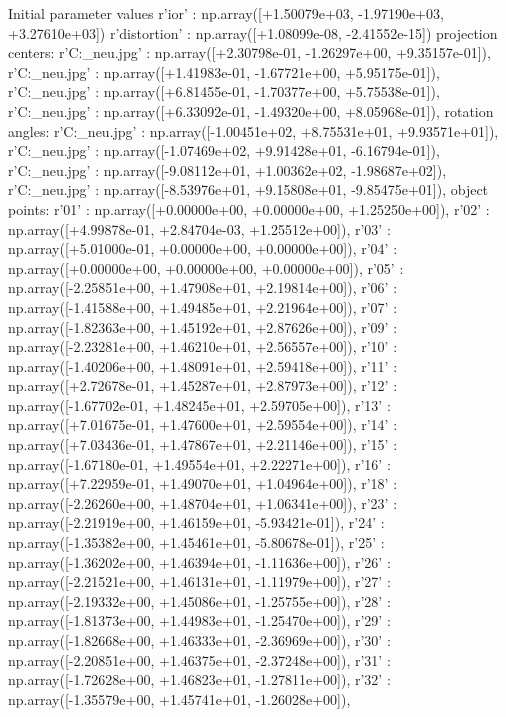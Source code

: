Initial parameter values
r'ior' : np.array([+1.50079e+03, -1.97190e+03, +3.27610e+03])
r'distortion' : np.array([+1.08099e-08, -2.41552e-15])
projection centers:
r'C:\Users\Clemens\Desktop\fotos_neu\1.jpg' : np.array([+2.30798e-01, -1.26297e+00, +9.35157e-01]),
r'C:\Users\Clemens\Desktop\fotos_neu\2.jpg' : np.array([+1.41983e-01, -1.67721e+00, +5.95175e-01]),
r'C:\Users\Clemens\Desktop\fotos_neu\3.jpg' : np.array([+6.81455e-01, -1.70377e+00, +5.75538e-01]),
r'C:\Users\Clemens\Desktop\fotos_neu\4.jpg' : np.array([+6.33092e-01, -1.49320e+00, +8.05968e-01]),
rotation angles:
r'C:\Users\Clemens\Desktop\fotos_neu\1.jpg' : np.array([-1.00451e+02, +8.75531e+01, +9.93571e+01]),
r'C:\Users\Clemens\Desktop\fotos_neu\2.jpg' : np.array([-1.07469e+02, +9.91428e+01, -6.16794e-01]),
r'C:\Users\Clemens\Desktop\fotos_neu\3.jpg' : np.array([-9.08112e+01, +1.00362e+02, -1.98687e+02]),
r'C:\Users\Clemens\Desktop\fotos_neu\4.jpg' : np.array([-8.53976e+01, +9.15808e+01, -9.85475e+01]),
object points:
r'01' : np.array([+0.00000e+00, +0.00000e+00, +1.25250e+00]),
r'02' : np.array([+4.99878e-01, +2.84704e-03, +1.25512e+00]),
r'03' : np.array([+5.01000e-01, +0.00000e+00, +0.00000e+00]),
r'04' : np.array([+0.00000e+00, +0.00000e+00, +0.00000e+00]),
r'05' : np.array([-2.25851e+00, +1.47908e+01, +2.19814e+00]),
r'06' : np.array([-1.41588e+00, +1.49485e+01, +2.21964e+00]),
r'07' : np.array([-1.82363e+00, +1.45192e+01, +2.87626e+00]),
r'09' : np.array([-2.23281e+00, +1.46210e+01, +2.56557e+00]),
r'10' : np.array([-1.40206e+00, +1.48091e+01, +2.59418e+00]),
r'11' : np.array([+2.72678e-01, +1.45287e+01, +2.87973e+00]),
r'12' : np.array([-1.67702e-01, +1.48245e+01, +2.59705e+00]),
r'13' : np.array([+7.01675e-01, +1.47600e+01, +2.59554e+00]),
r'14' : np.array([+7.03436e-01, +1.47867e+01, +2.21146e+00]),
r'15' : np.array([-1.67180e-01, +1.49554e+01, +2.22271e+00]),
r'16' : np.array([+7.22959e-01, +1.49070e+01, +1.04964e+00]),
r'18' : np.array([-2.26260e+00, +1.48704e+01, +1.06341e+00]),
r'23' : np.array([-2.21919e+00, +1.46159e+01, -5.93421e-01]),
r'24' : np.array([-1.35382e+00, +1.45461e+01, -5.80678e-01]),
r'25' : np.array([-1.36202e+00, +1.46394e+01, -1.11636e+00]),
r'26' : np.array([-2.21521e+00, +1.46131e+01, -1.11979e+00]),
r'27' : np.array([-2.19332e+00, +1.45086e+01, -1.25755e+00]),
r'28' : np.array([-1.81373e+00, +1.44983e+01, -1.25470e+00]),
r'29' : np.array([-1.82668e+00, +1.46333e+01, -2.36969e+00]),
r'30' : np.array([-2.20851e+00, +1.46375e+01, -2.37248e+00]),
r'31' : np.array([-1.72628e+00, +1.46823e+01, -1.27811e+00]),
r'32' : np.array([-1.35579e+00, +1.45741e+01, -1.26028e+00]),
